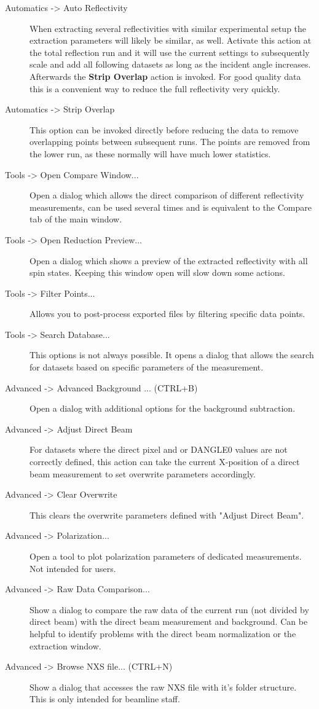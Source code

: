 \begin{description}
   \item[{ Automatics -> Auto Reflectivity}] When extracting several reflectivities with similar experimental setup the extraction parameters will likely be similar, as well. Activate this action at the total reflection run and it will use the current settings to subsequently scale and add all following datasets as long as the incident angle increases. Afterwards the \textbf{Strip Overlap} action is invoked. For good quality data this is a convenient way to reduce the full reflectivity very quickly.
   \item[{ Automatics -> Strip Overlap}] This option can be invoked directly before reducing the data to remove overlapping points between subsequent runs. The points are removed from the lower \Qz run, as these normally will have much lower statistics.
   
   \item[{ Tools -> Open Compare Window...}] Open a dialog which allows the direct comparison of different reflectivity measurements, can be used several times and is equivalent to the Compare tab of the main window.
   \item[{ Tools -> Open Reduction Preview...}] Open a dialog which shows a preview of the extracted reflectivity with all spin states. Keeping this window open will slow down some actions.
   \item[{ Tools -> Filter Points...}] Allows you to post-process exported files by filtering specific data points.
  \item[{ Tools -> Search Database...}] This options is not always possible. It opens a dialog that allows the search for datasets based on specific parameters of the measurement.

    
   \item[{Advanced -> Advanced Background ... (CTRL+B)}] Open a dialog with additional options for the background subtraction.
   \item[{ Advanced -> Adjust Direct Beam}] For datasets where the direct pixel and or DANGLE0 values are not correctly defined, this action can take the current X-position of a direct beam measurement to set overwrite parameters accordingly.
   \item[{ Advanced -> Clear Overwrite}] This clears the overwrite parameters defined with "Adjust Direct Beam".
   
   \item[{ Advanced -> Polarization...}] Open a tool to plot polarization parameters of dedicated measurements. Not intended for users.
   \item[{ Advanced -> Raw Data Comparison...}] Show a dialog to compare the raw data of the current run (not divided by direct beam) with the direct beam measurement and background. Can be helpful to identify problems with the direct beam normalization or the extraction window.
    \item[{ Advanced -> Browse NXS file... (CTRL+N)}] Show a dialog that accesses the raw NXS file with it's folder structure. This is only intended for beamline staff.


\end{description}
